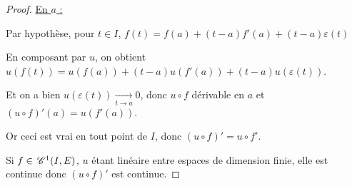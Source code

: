 
\begin{proof}
    \uline{En $a$ :}

    Par hypothèse, pour $t \in I$, $f(t) = f(a) + (t-a)f'(a) + (t-a)\varepsilon(t)$

    En composant par $u$, on obtient $u(f(t)) = u(f(a)) + (t-a)u(f'(a)) + (t-a)u(\varepsilon(t))$.

    Et on a bien $u(\varepsilon(t)) \xrightarrow[t \to a]{} 0$, donc $u \circ f$ dérivable en $a$ et $(u \circ f)'(a) = u(f'(a))$.

    Or ceci est vrai en tout point de $I$, donc $(u \circ f)' = u \circ f'$.

    Si $f \in \,\mathscr C^{1}(I, E)$, $u$ étant linéaire entre espaces de dimension finie, elle est continue donc $(u \circ f)'$ 
    est continue. 
\end{proof}

